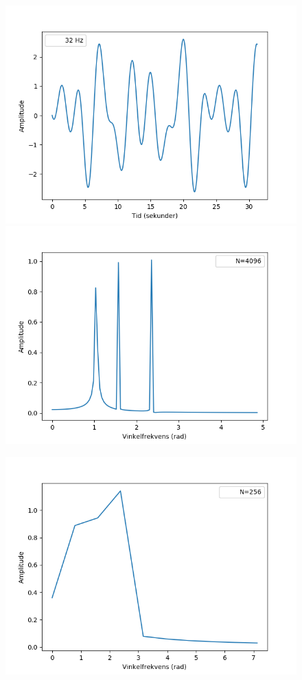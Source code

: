 \begin{figure}
\begin{minipage}{0.49\textwidth}
\includegraphics[width=\textwidth]{figures/signal_32hz.png}
\includegraphics[width=\textwidth]{figures/frekvensanalyse/32hz_freq2}
\end{minipage}
\begin{minipage}{0.49\textwidth}
\includegraphics[width=\textwidth]{figures/frekvensanalyse/32hz_freq1.png}

\end{minipage}
\end{figure}
